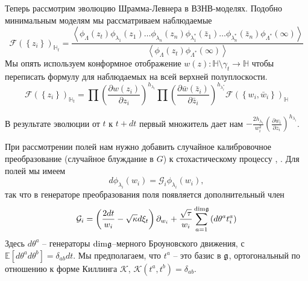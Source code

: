 Теперь рассмотрим эволюцию Шрамма-Левнера в ВЗНВ-моделях. 
Подобно минимальным моделям мы рассматриваем наблюдаемые
\begin{equation*}
  \mathcal{F}(\left\{z_{i}\right\})_{\mathbb{H}_{t}}=
  \frac{\left<\phi_{\Lambda}(z_{t}) \phi_{\lambda_1}(z_{1}) \dots \phi_{\lambda_n}(z_{n}) \phi_{\lambda^{*}_1}(\bar z_{1}) \dots \phi_{\lambda^{*}_n}(\bar z_{n})
      \phi_{\Lambda^{*}}(\infty)\right>}{\left<\phi_{\Lambda}(z_{t})\phi_{\Lambda^{*}}(\infty)\right>}
\end{equation*}
Мы опять используем конформное отображение  $w(z):\mathbb{H}\setminus\gamma_{t}\to \mathbb{H}$ чтобы переписать формулу для наблюдаемых на всей верхней полуплоскости.
\begin{equation*}
  \mathcal{F}(\left\{z_{i}\right\})_{\mathbb{H}_{t}}=\prod \left(\frac{\partial w(z_{i})}{\partial z_{i}}\right)^{h_{\lambda_i}} 
  \prod \left(\frac{\partial \bar w(\bar z_{i})}{\partial \bar z_{i}}\right)^{h_{\lambda^{*}_i}}
  \mathcal{F}(\left\{w_{i}, \bar w_{i}\right\})_{\mathbb{H}}
\end{equation*}

В результате эволюции от $t$ к $t+dt$ первый множитель дает нам $-\frac{2h_{\lambda_{i}}}{w_{i}^{2}}\left(\frac{\partial w_{i}}{\partial z_{i}}\right)^{h_{\lambda_{i}}}$.

При рассмотрении полей нам нужно добавить случайное калибровочное преобразование  (случайное блуждание в $G$) к стохастическому процессу \cite{bettelheim2005stochastic}, \cite{alekseev2010sle}. 
Для полей мы имеем
\begin{equation*}
  d\phi_{\lambda_{i}}(w_{i}) = \mathcal{G}_{i}\phi_{\lambda_{i}}(w_{i}),
\end{equation*}
так что в генераторе преобразования поля появляется дополнительный член
\begin{equation}
  \mathcal{G}_{i}=\left(\frac{2dt}{w_{i}}-\sqrt{\kappa} d\xi_{t}\right) \partial_{w_{i}}+\frac{\sqrt{\tau}}{w_{i}}\sum_{a=1}^{\mathrm{dim} \mathfrak{g}}\left(d \theta ^{a} t^{a}_{i}\right)
\label{eq:18}
\end{equation}
Здесь  $d\theta^{a}$ -- генераторы  $\mathrm{dim}\mathfrak{g}$--мерного Броуновского движения, с $\mathbb{E}[d\theta^{a}d\theta^{b}]=\delta_{ab}dt$. Мы предполагаем, что $t^{a}$ -- это базис в $\mathfrak{g}$, ортогональный по отношению к форме Киллинга $\mathcal{K}$, $\mathcal{K}(t^{a},t^{b})=\delta_{ab}$.

